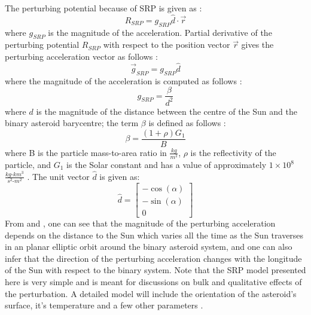 The perturbing potential because of \gls{SRP} is given as \cite{dan_orb_mech}:
\begin{equation}
\label{srp_pot}
R_{SRP} = g_{SRP} \hat{d} \cdot \overrightarrow{r}
\end{equation}
%
where $g_{SRP}$ is the magnitude of the acceleration. Partial derivative of the perturbing potential $R_{SRP}$ with respect to the position vector $\overrightarrow{r}$ gives the perturbing acceleration vector as follows \cite{dan_orb_mech}:
\begin{equation}
\label{srp_acc}
\overrightarrow{g}_{SRP} = g_{SRP} \hat{d}
\end{equation}
%
where the magnitude of the acceleration is computed as follows \cite{dan_orb_mech}:
\begin{equation}
\label{srp_acc_mag}
g_{SRP} = \frac{\beta}{d^2}
\end{equation}
%
where $d$ is the magnitude of the distance between the centre of the Sun and the binary asteroid barycentre; the term $\beta$ is defined as follows \cite{dan_orb_mech}:
\begin{equation}
\beta = \frac{(1+\rho)G_1}{B}
\end{equation}
%
where B is the particle mass-to-area ratio in $\frac{kg}{m^2}$, $\rho$ is the reflectivity of the particle, and $G_1$ is the Solar constant and has a value of approximately $1\times10^8$ $\frac{kg\text{-}km^3}{s^2\text{-}m^2}$ \cite{dan_orb_mech}. The unit vector $\hat{d}$ is given as:
\begin{equation}
\label{d_unit}
\hat{d}
=
\begin{bmatrix}
-\cos(\alpha)\\
-\sin(\alpha)\\
0
\end{bmatrix}
\end{equation}
%
From  and , one can see that the magnitude of the perturbing acceleration depends on the distance to the Sun which varies all the time as the Sun traverses in an planar elliptic orbit around the binary asteroid system, and one can also infer that the direction of the perturbing acceleration changes with the longitude of the Sun with respect to the binary system. Note that the \gls{SRP} model presented here is very simple and is meant for discussions on bulk and qualitative effects of the perturbation. A detailed model will include the orientation of the asteroid's surface, it's temperature and a few other parameters \cite{scheeres_srp_regolith}.

